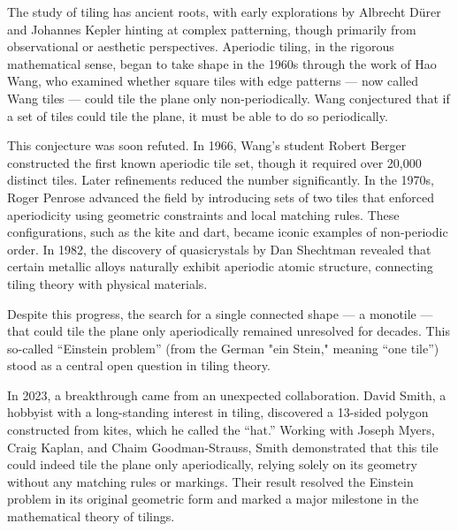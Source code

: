 \begin{historical}
The study of tiling has ancient roots, with early explorations by Albrecht Dürer and Johannes Kepler hinting at complex patterning, though primarily from observational or aesthetic perspectives. Aperiodic tiling, in the rigorous mathematical sense, began to take shape in the 1960s through the work of Hao Wang, who examined whether square tiles with edge patterns — now called Wang tiles — could tile the plane only non-periodically. Wang conjectured that if a set of tiles could tile the plane, it must be able to do so periodically.

This conjecture was soon refuted. In 1966, Wang’s student Robert Berger constructed the first known aperiodic tile set, though it required over 20,000 distinct tiles. Later refinements reduced the number significantly. In the 1970s, Roger Penrose advanced the field by introducing sets of two tiles that enforced aperiodicity using geometric constraints and local matching rules. These configurations, such as the kite and dart, became iconic examples of non-periodic order. In 1982, the discovery of quasicrystals by Dan Shechtman revealed that certain metallic alloys naturally exhibit aperiodic atomic structure, connecting tiling theory with physical materials.

Despite this progress, the search for a single connected shape — a monotile — that could tile the plane only aperiodically remained unresolved for decades. This so-called “Einstein problem” (from the German "ein Stein," meaning “one tile”) stood as a central open question in tiling theory.

In 2023, a breakthrough came from an unexpected collaboration. David Smith, a hobbyist with a long-standing interest in tiling, discovered a 13-sided polygon constructed from kites, which he called the “hat.” Working with Joseph Myers, Craig Kaplan, and Chaim Goodman-Strauss, Smith demonstrated that this tile could indeed tile the plane only aperiodically, relying solely on its geometry without any matching rules or markings. Their result resolved the Einstein problem in its original geometric form and marked a major milestone in the mathematical theory of tilings.
\end{historical}
